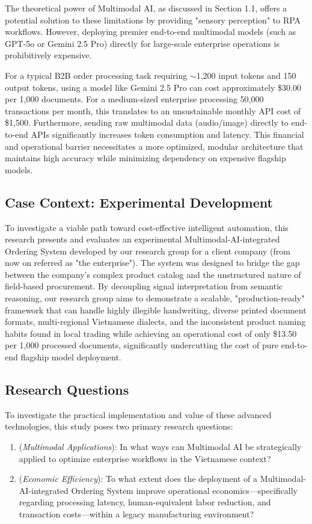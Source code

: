 The theoretical power of Multimodal AI, as discussed in Section 1.1, offers a potential solution to these limitations by providing "sensory perception" to RPA workflows. However, deploying premier end-to-end multimodal models (such as GPT-5o or Gemini 2.5 Pro) directly for large-scale enterprise operations is prohibitively expensive.

For a typical B2B order processing task requiring $\sim$1,200 input tokens and 150 output tokens, using a model like Gemini 2.5 Pro can cost approximately \$30.00 per 1,000 documents. For a medium-sized enterprise processing 50,000 transactions per month, this translates to an unsustainable monthly API cost of \$1,500. Furthermore, sending raw multimodal data (audio/image) directly to end-to-end APIs significantly increases token consumption and latency. This financial and operational barrier necessitates a more optimized, modular architecture that maintains high accuracy while minimizing dependency on expensive flagship models.

\subsection{Case Context: Experimental Development}
To investigate a viable path toward cost-effective intelligent automation, this research presents and evaluates an experimental Multimodal-AI-integrated Ordering System developed by our research group for a client company (from now on referred as "the enterprise"). The system was designed to bridge the gap between the company's complex product catalog and the unstructured nature of field-based procurement. By decoupling signal interpretation from semantic reasoning, our research group aims to demonstrate a scalable, "production-ready" framework that can handle highly illegible handwriting, diverse printed document formats, multi-regional Vietnamese dialects, and the inconsistent product naming habits found in local trading while achieving an operational cost of only \$13.50 per 1,000 processed documents, significantly undercutting the cost of pure end-to-end flagship model deployment.

\subsection{Research Questions}
To investigate the practical implementation and value of these advanced technologies, this study poses two primary research questions:
\begin{enumerate}
    \item[\textbf{RQ1}] (\textit{Multimodal Applications}): In what ways can Multimodal AI be strategically applied to optimize enterprise workflows in the Vietnamese context?
    \item[\textbf{RQ2}] (\textit{Economic Efficiency}): To what extent does the deployment of a Multimodal-AI-integrated Ordering System improve operational economics—specifically regarding processing latency, human-equivalent labor reduction, and transaction costs—within a legacy manufacturing environment?
\end{enumerate}

